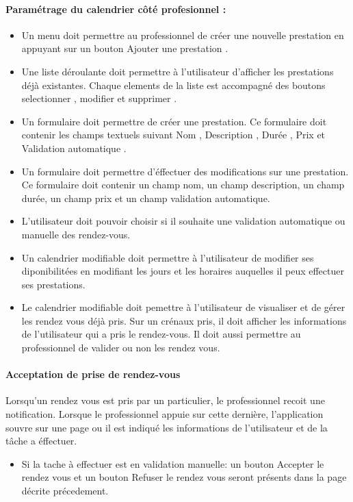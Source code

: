 \documentclass{article}
\begin{document}
\paragraph{Paramétrage du calendrier côté profesionnel :}
\begin{itemize}
\item Un menu doit permettre au professionnel de créer une nouvelle
  prestation en appuyant sur un bouton \og Ajouter une prestation
  \fg{}.
\item Une liste déroulante doit permettre à l'utilisateur d'afficher
  les prestations déjà existantes. Chaque elements de la liste est
  accompagné des boutons \og selectionner \fg{}, \og modifier \fg{} et
  \og supprimer \fg{}.

\item Un formulaire doit permettre de créer une prestation. Ce
  formulaire doit contenir les champs textuels suivant \og Nom \fg{}, \og Description
 \fg{},  \og Durée \fg{}, \og Prix \fg{} et \og Validation automatique \fg{}.


\item Un formulaire doit permettre d'éffectuer des modifications sur
  une prestation. Ce formulaire doit contenir un champ nom, un champ description, un champ
  durée, un champ prix et un champ validation automatique.
\item L'utilisateur doit pouvoir choisir si il souhaite une validation automatique ou manuelle des rendez-vous.
\item Un calendrier modifiable doit permettre à l'utilisateur de
  modifier ses diponibilitées en modifiant les jours et les horaires
  auquelles il peux effectuer ses prestations.
\item Le calendrier modifiable doit pemettre à l'utilisateur de
  visualiser et de gérer les rendez vous déjà pris. Sur un crénaux
  pris, il doit afficher les informations de l'utilisateur qui a pris
  le rendez-vous. Il doit aussi permettre au professionnel de valider
  ou non les rendez vous.
\end{itemize}

\paragraph{Acceptation de prise de rendez-vous}


Lorsqu'un rendez vous est pris par un particulier, le
  professionnel recoit une notification. Lorsque le professionnel
  appuie sur cette dernière, l'application souvre sur une page ou il
  est indiqué les informations de l'utilisateur et de la tâche a éffectuer.
\begin{itemize}
\item  Si la tache à effectuer est en validation manuelle: un bouton \og
  Accepter le rendez vous \fg{} et un bouton \og
  Refuser le rendez vous \fg{} seront présents dans la page décrite précedement.
\end{itemize}
\end{document}

